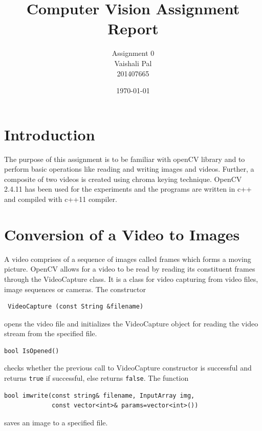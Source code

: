 \documentclass[12pt]{article}
\author{Assignment 0 \\Vaishali Pal \\ 201407665}
\title{Computer Vision Assignment Report}
\date{\today}
\begin{document}
  \maketitle
  
\section{Introduction}
The purpose of this assignment is to be familiar with openCV library and to perform basic operations like reading and writing images and videos. Further, a composite of two videos is created using chroma keying technique. OpenCV 2.4.11 has been used for the experiments and the programs are written in c++ and compiled with c++11 compiler. 

\section{Conversion of a Video to Images}
A video comprises of a sequence of images called frames which forms a moving picture. OpenCV allows for a video to be read by reading its constituent frames through the VideoCapture class. It is a class for video capturing from video files, image sequences or cameras.  The constructor
\begin{verbatim} VideoCapture (const String &filename)
\end{verbatim} opens the video file and initializes the VideoCapture object for reading the video stream from the specified file.
\begin{verbatim} 
bool IsOpened()
\end{verbatim} checks whether the previous call to VideoCapture constructor is successful and returns \texttt{true} if successful, else returns \texttt{false}. The function \begin{verbatim}bool imwrite(const string& filename, InputArray img, 
             const vector<int>& params=vector<int>())\end{verbatim} saves an image to a specified file.
\end{document}
